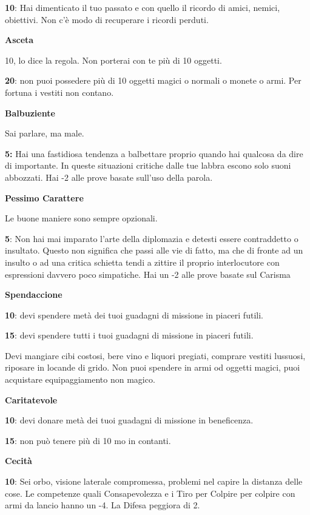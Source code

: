 \documentclass[a4paper,twoside,openany]{book}
\begin{document}
\begin{multicols}{2}
\textbf{10}: Hai dimenticato il tuo passato e con quello il ricordo di amici, nemici, obiettivi. Non c'è modo di recuperare i ricordi perduti.

\textbf{Asceta}

10, lo dice la regola. Non porterai con te più di 10 oggetti.

\textbf{20}: non puoi possedere più di 10 oggetti magici o normali o monete o armi. Per fortuna i vestiti non contano.

\textbf{Balbuziente}

Sai parlare, ma male.

\textbf{5:} Hai una fastidiosa tendenza a balbettare proprio quando hai qualcosa da dire di importante. In queste situazioni critiche dalle tue labbra escono solo suoni abbozzati. Hai -2 alle prove basate sull'uso della parola.

\textbf{Pessimo Carattere}

Le buone maniere sono sempre opzionali.

\textbf{5}: Non hai mai imparato l'arte della diplomazia e detesti essere contraddetto o insultato. Questo non significa che passi alle vie di fatto, ma che di fronte ad un insulto o ad una critica schietta tendi a zittire il proprio interlocutore con espressioni davvero poco simpatiche. Hai un -2 alle prove basate sul Carisma

\textbf{Spendaccione}

\textbf{10}: devi spendere metà dei tuoi guadagni di missione in piaceri futili.

\textbf{15}: devi spendere tutti i tuoi guadagni di missione in piaceri futili.

Devi mangiare cibi costosi, bere vino e liquori pregiati, comprare vestiti lussuosi, riposare in locande di grido. Non puoi spendere in armi od oggetti magici, puoi acquistare equipaggiamento non magico.

\textbf{Caritatevole}

\textbf{10}: devi donare metà dei tuoi guadagni di missione in beneficenza.

\textbf{15}: non può tenere più di 10 mo in contanti.

\textbf{Cecità}

\textbf{10}: Sei orbo, visione laterale compromessa, problemi nel capire la distanza delle cose.
Le competenze quali Consapevolezza e i Tiro per Colpire per colpire con armi da lancio hanno un -4. La Difesa peggiora di 2.


\end{multicols}
\end{document}
